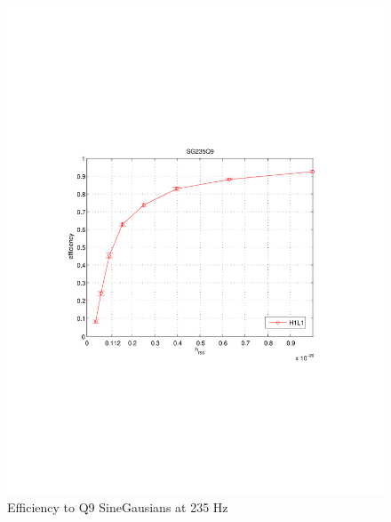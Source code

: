 \begin{figure}[h]
\begin{center}
\includegraphics[width=1.0\textwidth]{figures/H1L1_eff_sg235q9_20050829_2.pdf}
\caption{Efficiency to Q9 SineGausians at 235 Hz}
\label{fig:sg235q9eff}
\end{center}
\end{figure}

